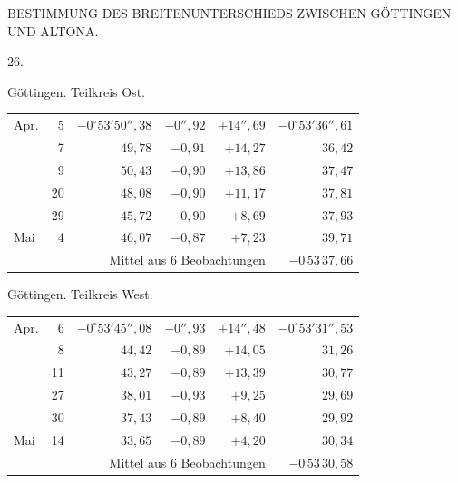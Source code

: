 \clearpage
\noindent{}\parbox[t]{\dimexpr\textwidth-10mm\relax}{\centering\scriptsize BESTIMMUNG DES BREITENUNTERSCHIEDS ZWISCHEN GÖTTINGEN UND ALTONA.}\par
\begin{center}26.\end{center}

\noindent\begin{minipage}[t]{.495\textwidth}\centering Göttingen. Teilkreis Ost.\par\smallskip
{\scriptsize\setlength{\tabcolsep}{1pt}\renewcommand{\arraystretch}{1.2}\begin{tabular}{lr|r|r|r|r|}
Apr.&5&$-0^\circ53'50''{,}38$&$-0''{,}92$&$+14''{,}69$&$-0^\circ53'36''{,}61$\\
&7&$49{,}78$&$-0{,}91$&$+14{,}27$&$36{,}42$\\
&9&$50{,}43$&$-0{,}90$&$+13{,}86$&$37{,}47$\\
&20&$48{,}08$&$-0{,}90$&$+11{,}17$&$37{,}81$\\
&29&$45{,}72$&$-0{,}90$&$+8{,}69$&$37{,}93$\\
Mai&4&$46{,}07$&$-0{,}87$&$+7{,}23$&$39{,}71$\\
\cline{6-6}\multicolumn{5}{r}{Mittel aus 6 Beobachtungen}&$-0\,53\,37{,}66$
\end{tabular}}\end{minipage}\hfill\begin{minipage}[t]{.495\textwidth}\centering Göttingen. Teilkreis West.\par\smallskip
{\scriptsize\setlength{\tabcolsep}{1pt}\renewcommand{\arraystretch}{1.2}\begin{tabular}{lr|r|r|r|r}
Apr.&6&$-0^\circ53'45''{,}08$&$-0''{,}93$&$+14''{,}48$&$-0^\circ53'31''{,}53$\\
&8&$44{,}42$&$-0{,}89$&$+14{,}05$&$31{,}26$\\
&11&$43{,}27$&$-0{,}89$&$+13{,}39$&$30{,}77$\\
&27&$38{,}01$&$-0{,}93$&$+9{,}25$&$29{,}69$\\
&30&$37{,}43$&$-0{,}89$&$+8{,}40$&$29{,}92$\\
Mai&14&$33{,}65$&$-0{,}89$&$+4{,}20$&$30{,}34$\\
\cline{6-6}\multicolumn{5}{r}{Mittel aus 6 Beobachtungen}&$-0\,53\,30{,}58$
\end{tabular}}\end{minipage}
\par\vspace{4mm}

